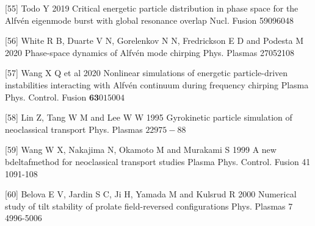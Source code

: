 \documentclass[10pt]{article}
\begin{document}
[55] Todo Y 2019 Critical energetic particle distribution in phase space for the Alfvén eigenmode burst with global resonance overlap Nucl. Fusion 59096048

[56] White R B, Duarte V N, Gorelenkov N N, Fredrickson E D and Podesta M 2020 Phase-space dynamics of Alfvén mode chirping Phys. Plasmas 27052108

[57] Wang X Q et al 2020 Nonlinear simulations of energetic particle-driven instabilities interacting with Alfvén continuum during frequency chirping Plasma Phys. Control. Fusion $\mathbf{6 3} 015004$

[58] Lin Z, Tang W M and Lee W W 1995 Gyrokinetic particle simulation of neoclassical transport Phys. Plasmas $22975-88$

[59] Wang W X, Nakajima N, Okamoto M and Murakami S 1999 A new bdeltafmethod for neoclassical transport studies Plasma Phys. Control. Fusion 41 1091-108

[60] Belova E V, Jardin S C, Ji H, Yamada M and Kulsrud R 2000 Numerical study of tilt stability of prolate field-reversed configurations Phys. Plasmas 7 4996-5006
\end{document}
